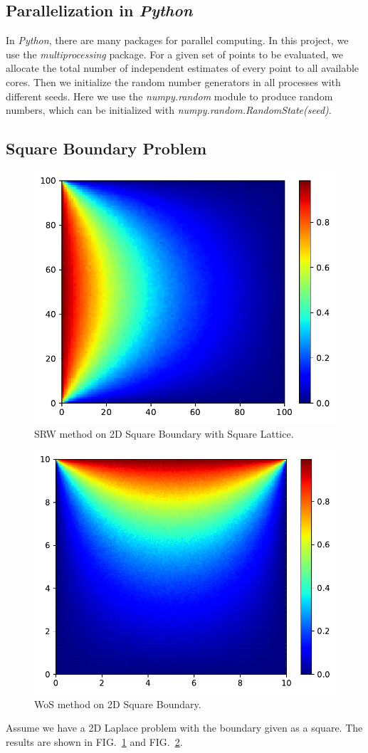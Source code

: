 \documentclass[aps, prl, reprint, groupedaddress]{revtex4-1}
\begin{document}
\subsection{Parallelization in \emph{Python}}

In \emph{Python}, there are many packages for parallel computing. In this project, we use the \emph{multiprocessing} package. For a given set of points to be evaluated, we allocate the total number of independent estimates of every point to all available cores. Then we initialize the random number generators in all processes with different seeds. Here we use the \emph{numpy.random} module to produce random numbers, which can be initialized with \emph{numpy.random.RandomState(seed)}.

\subsection{Square Boundary Problem}

\begin{figure}[htbp]
    \centering
    \includegraphics[width=.4\textwidth]{./figs/srw_s}
    \caption{\label{fig:srw_s} SRW method on 2D Square Boundary with Square Lattice.}
\end{figure}

\begin{figure}[htbp]
    \centering
    \includegraphics[width=.4\textwidth]{./figs/wos_s}
    \caption{\label{fig:wos_s} WoS method on 2D Square Boundary.}
\end{figure}

Assume we have a 2D Laplace problem with the boundary given as a square. The results are shown in FIG.~\ref{fig:srw_s} and FIG.~\ref{fig:wos_s}.
\end{document}
